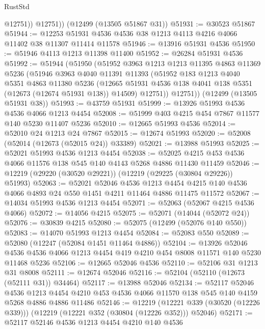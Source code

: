 \begin{lexlean}{RustStd}
\begin{coremodule}
{\begin{coremodule}
{{{{{{{{{{{{{{{{{{{{{{{{{{{{{{{{{{{{{{{{{{{{{{{{{{{{{{{{{{{{{{{{{{{{{{{{{{{{{{{{            @12751))
        @12751))
    (@12499 (@13505 @51867 @31))
@51931 := @30523 @51867
@51944 := @12253 @51931 @4536 @4536 @38 @1213 @4113 @4216 @4066 @11402 @38 @11307 @11414 @11578
@51946 := @13916 @51931 @4536
@51950 := @51946 @4113 @1213 @11398 @11400
@51952 := @26284 @51931 @4536
@51992 := @51944
    (@51950
      (@51952
        @3963
        @1213
        @1213
        @11395
        @4863
        @11369
        @5236
        (@51946
          @3963
          @4040
          @11391
          @11393
          (@51952
            @183
            @1213
            @4040
            @5351
            @4863
            @11380
            @5236
            (@12665 @51931 @4536 @138 @4041 @138 @5351 (@12673 (@12674 @51931 @138)) @14509)
            @12751))
        @12751))
    (@12499 (@13505 @51931 @38))
@51993 := @43759 @51931
@51999 := @13926 @51993 @4536 @4536 @4066 @1213 @4454
@52008 := @51999 @403 @4215 @454 @7867 @11577 @140 @5230 @11407 @5236
@52010 := @12665 @51993 @4536
@52014 := @52010 @24 @1213 @24 @7867
@52015 := @12674 @51993
@52020 := @52008 (@52014 (@12673 (@52015 @24)) @33389)
@52021 := @13988 @51993
@52025 := @52021 @51993 @4536 @1213 @4454
@52038 := @52025 @4215 @453 @4536 @4066 @11576 @138 @545 @140 @4143 @5268 @4886 @11430 @11459
@52046 := @12219 (@29220 (@30520 @29221)) (@12219 (@29225 (@30804 @29226)) @51993)
@52063 := @52021
    @52046
    @4536
    @1213
    @4454
    @4215
    @140
    @4536
    @4066
    @4893
    @24
    @550
    @1451
    @4211
    @11464
    @4886
    @11475
    @11572
@52067 := @14034 @51993 @4536 @1213 @4454
@52071 := @52063 (@52067 @4215 @4536 @4066)
@52072 := @14056 @4215
@52075 := @52071 (@14044 (@52072 @24))
@52076 := @30839 @4215
@52080 := @52075 (@12499 (@52076 @140 @550))
@52083 := @14070 @51993 @1213 @4454
@52084 := @52083 @550
@52089 := @52080 (@12247 (@52084 @1451 @11464 @4886))
@52104 := @13926
    @52046
    @4536
    @4536
    @4066
    @1213
    @4454
    @419
    @4210
    @454
    @8008
    @11571
    @140
    @5230
    @11468
    @5236
@52106 := @12665 @52046 @4536
@52110 := @52106 @31 @1213 @31 @8008
@52111 := @12674 @52046
@52116 := @52104 (@52110 (@12673 (@52111 @31)) @34464)
@52117 := @13988 @52046
@52134 := @52117
    @52046
    @4536
    @1213
    @4454
    @4210
    @453
    @4536
    @4066
    @11570
    @138
    @545
    @140
    @4159
    @5268
    @4886
    @4886
    @11486
@52146 := @12219
    (@12221 @339 (@30520 (@12226 @339)))
    (@12219 (@12221 @352 (@30804 (@12226 @352))) @52046)
@52171 := @52117
    @52146
    @4536
    @1213
    @4454
    @4210
    @140
    @4536
}}}}}}}}}}}}}}}}}}}}}}}}}}}}}}}}}}}}}}}}}}}}}}}}}}}}}}}}}}}}}}}}}}}}}}}}}}}}}}}}
\end{coremodule}}
\end{coremodule}
\end{lexlean}
